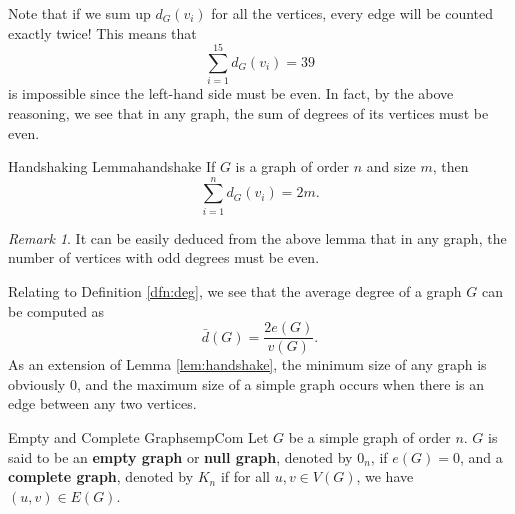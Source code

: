 \documentclass[math, code]{amznotes}
\theoremstyle{remark}
\newtheorem*{remark}{Remark}
\begin{document}
Note that if we sum up $d_G(v_i)$ for all the vertices, every edge will be counted exactly twice! This means that
\begin{equation*}
    \sum_{i = 1}^{15}d_G(v_i) = 39
\end{equation*}
is impossible since the left-hand side must be even. In fact, by the above reasoning, we see that in any graph, the sum of degrees of its vertices must be even.
\begin{lembox}{Handshaking Lemma}{handshake}
    If $G$ is a graph of order $n$ and size $m$, then
    \begin{equation*}
        \sum_{i = 1}^{n}d_G(v_i) = 2m.
    \end{equation*}
\end{lembox}
\begin{notebox}
    \begin{remark}
        It can be easily deduced from the above lemma that in any graph, the number of vertices with odd degrees must be even.
    \end{remark}
\end{notebox}
Relating to Definition \ref{dfn:deg}, we see that the average degree of a graph $G$ can be computed as
\begin{equation*}
    \bar{d}(G) = \frac{2e(G)}{v(G)}.
\end{equation*}
As an extension of Lemma \ref{lem:handshake}, the minimum size of any graph is obviously $0$, and the maximum size of a simple graph occurs when there is an edge between any two vertices.
\begin{dfnbox}{Empty and Complete Graphs}{empCom}
    Let $G$ be a simple graph of order $n$. $G$ is said to be an {\color{red} \textbf{empty graph}} or {\color{red} \textbf{null graph}}, denoted by $0_n$, if $e(G) = 0$, and a {\color{red} \textbf{complete graph}}, denoted by $K_n$ if for all $u, v \in V(G)$, we have $(u, v) \in E(G)$. 
\end{dfnbox}
\end{document}
